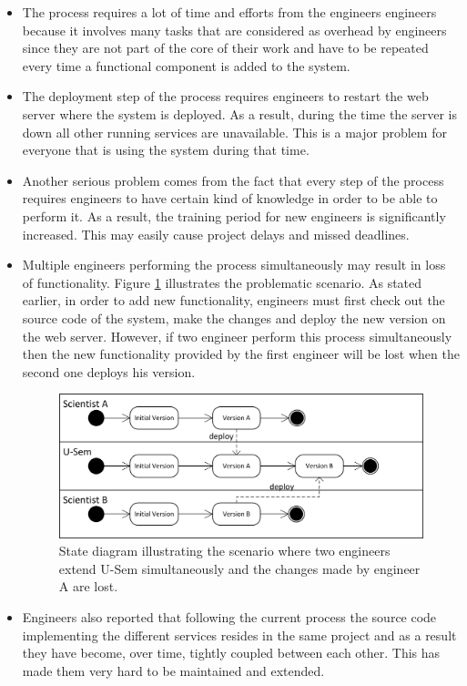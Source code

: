\begin{itemize}

	\item The process requires a lot of time and efforts from the engineers engineers because it involves many tasks that are considered as overhead by engineers since they are not part of the core of their work and have to be repeated every time a functional component is added to the system.
	
	\item The deployment step of the process requires engineers to restart the web server where the system is deployed. As a result, during the time the server is down all other running services are unavailable. This is a major problem for everyone that is using the system during that time.
	
	\item Another serious problem comes from the fact that every step of the process requires engineers to have certain kind of knowledge in order to be able to perform it. As a result, the training period for new engineers is significantly increased. This may easily cause project delays and missed deadlines.
	
	\item Multiple engineers performing the process simultaneously may result in loss of functionality. Figure \ref{fig_vers_prob} illustrates the problematic scenario. As stated earlier, in order to add new functionality, engineers must first check out the source code of the system, make the changes and deploy the new version on the web server. However, if two engineer perform this process simultaneously then the new functionality provided by the first engineer will be lost when the second one deploys his version. 
	
	\begin{figure}[h!]
  \centering
  	\includegraphics[scale=0.75]{plug-in/version_problem.png}
  \caption{State diagram illustrating the scenario where two engineers extend U-Sem simultaneously and the changes made by engineer A are lost.  }
  \label{fig_vers_prob}
\end{figure}
	
	\item Engineers also reported that following the current process the source code implementing the different services resides in the same project and as a result they have become, over time, tightly coupled between each other. This has made them very hard to be maintained and extended.
		
\end{itemize}

